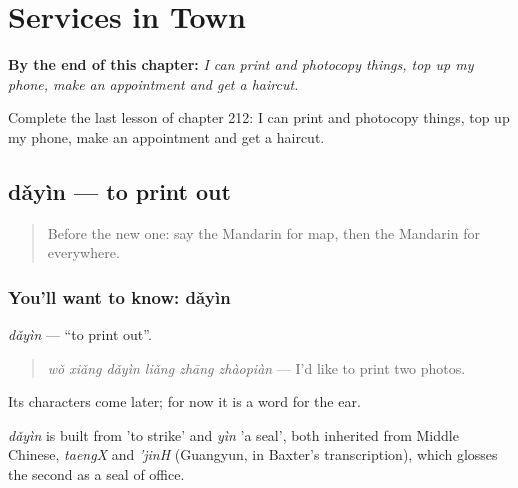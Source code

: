 
\chapter{Services in Town}
\label{ch:zh-services-in-town}

\begin{chapteropening}
\textbf{By the end of this chapter:} \emph{I can print and photocopy things, top up my phone, make an appointment and get a haircut.}

Complete the last lesson of chapter 212: I can print and photocopy things, top up my phone, make an appointment and get a haircut.
\end{chapteropening}

\section[dǎyìn]{dǎyìn — to print out}

\label{lesson:ZH-C212-dayin}



\begin{quote}
Before the new one: say the Mandarin for map, then the Mandarin for everywhere.
\end{quote}

\subsection*{You'll want to know: dǎyìn}
\emph{dǎyìn} — \textquotedblleft{}to print out\textquotedblright{}.

\begin{quote}
\emph{wǒ xiǎng dǎyìn liǎng zhāng zhàopiàn} — I'd like to print two photos.
\end{quote}

Its characters come later; for now it is a word for the ear.

\begin{cousinweb}
\emph{dǎyìn} is built from  'to strike' and \emph{yìn} 'a seal', both inherited from Middle Chinese, \emph{taengX} and \emph{'jinH} (Guangyun, in Baxter's transcription), which glosses the second as a seal of office.
\end{cousinweb}

